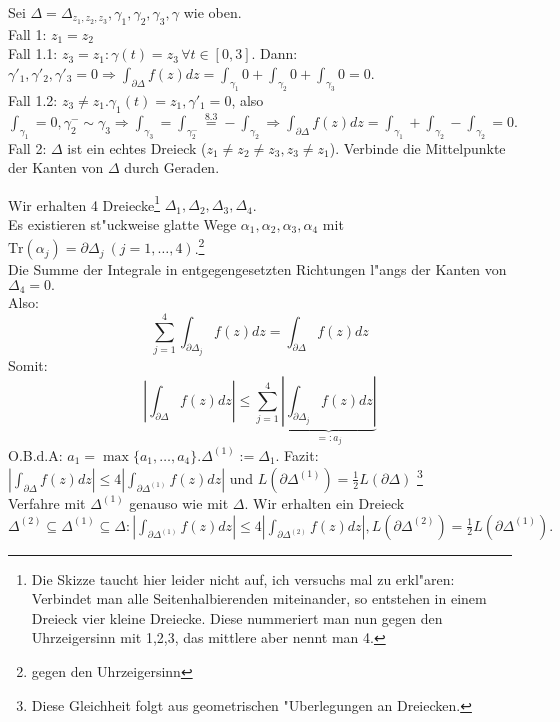 \documentclass[a4paper,twoside,DIV15,BCOR12mm]{scrbook}
\def\Tr{\text{Tr}}
\begin{document}
\begin{beweis}
Sei $\Delta = \Delta_{z_1,z_2,z_3}, \gamma_1,\gamma_2,\gamma_3,\gamma$ wie oben.\\
Fall 1: $z_1=z_2$\\
Fall 1.1: $z_3=z_1: \gamma(t)=z_3 \,\forall t\in[0,3]$. Dann: $\gamma'_1,\gamma'_2,\gamma'_3=0 \Rightarrow \int_{\partial\Delta}f(z)dz = \int_{\gamma_1}0 + \int_{\gamma_2}0 + \int_{\gamma_3}0 = 0$.\\
Fall 1.2: $z_3 \not= z_1. \gamma_1(t)=z_1, \gamma'_1=0$, also $\int_{\gamma_1}=0, \gamma_2^{-} \sim \gamma_3 \Rightarrow \int_{\gamma_3} = \int_{\gamma_2^-} \stackrel{8.3}{=} - \int_{\gamma_2} \Rightarrow \int_{\partial\Delta}f(z)dz = \int_{\gamma_1} + \int_{\gamma_2} - \int_{\gamma_2} = 0.$\\
Fall 2: $\Delta$ ist ein echtes Dreieck ($z_1\not=z_2\not=z_3, z_3\not=z_1$). Verbinde die Mittelpunkte der Kanten von $\Delta$ durch Geraden.

%
%

Wir erhalten 4 Dreiecke\footnote{Die Skizze taucht hier leider nicht auf, ich versuchs mal zu erkl"aren: Verbindet man alle Seitenhalbierenden miteinander, so entstehen in einem Dreieck vier kleine Dreiecke. Diese nummeriert man nun gegen den Uhrzeigersinn mit 1,2,3, das mittlere aber nennt man 4.} $\Delta_1,\Delta_2,\Delta_3,\Delta_4$.\\
Es existieren st"uckweise glatte Wege $\alpha_1,\alpha_2,\alpha_3,\alpha_4$ mit $\Tr(\alpha_j) = \partial\Delta_j\ (j=1,\ldots,4)$.\footnote{gegen den Uhrzeigersinn}\\
Die Summe der Integrale in entgegengesetzten Richtungen l"angs der Kanten von $\Delta_4=0.$\\ %
Also: 
\[
\sum_{j=1}^4 \int_{\partial\Delta_j}f(z)dz = \int_{\partial\Delta} f(z)dz
\]
Somit:  
\[
\left|\int_{\partial\Delta} f(z)dz \right| \leq \sum_{j=1}^4  \underbrace{\left| \int_{\partial\Delta_j} f(z)dz \right|}_{=: a_j}
\]
O.B.d.A: $a_1 = \max\{a_1,\ldots,a_4\}. \Delta^{(1)}:=\Delta_1$. Fazit: $|\int_{\partial\Delta} f(z)dz| \leq 4 | \int_{\partial\Delta^{(1)}} f(z)dz|$ und $L(\partial\Delta^{(1)}) = \frac12L(\partial\Delta)$ \footnote{Diese Gleichheit folgt aus geometrischen "Uberlegungen an Dreiecken.}
\\
Verfahre mit $\Delta^{(1)}$ genauso wie mit $\Delta$. Wir erhalten ein Dreieck $\Delta^{(2)} \subseteq \Delta^{(1)} \subseteq \Delta: |\int_{\partial\Delta^{(1)}} f(z)dz| \leq 4 |\int_{\partial\Delta^{(2)}} f(z)dz|, L(\partial\Delta^{(2)})= \frac12L(\partial\Delta^{(1)}).$\\


\end{beweis}
\end{document}
